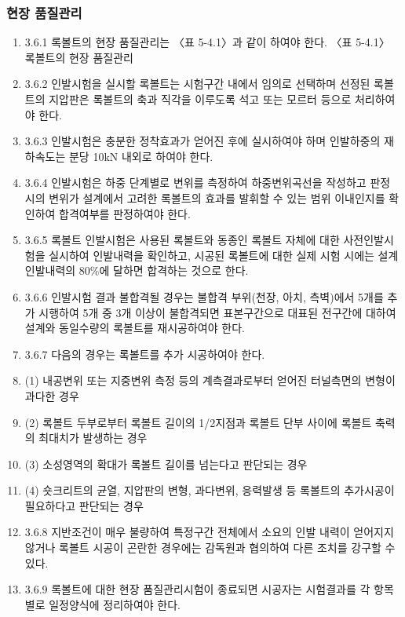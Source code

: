 \subsubsection{  현장 품질관리}
\begin{enumerate}
\item  3.6.1 록볼트의 현장 품질관리는 〈표 5-4.1〉과 같이 하여야 한다.  
〈표 5-4.1〉 록볼트의 현장 품질관리
\item  3.6.2 인발시험을 실시할 록볼트는 시험구간 내에서 임의로 선택하며 선정된 록볼트의 지압판은 록볼트의 축과 직각을 이루도록 석고 또는 모르터 등으로 처리하여야 한다.  
\item  3.6.3 인발시험은 충분한 정착효과가 얻어진 후에 실시하여야 하며 인발하중의 재하속도는 분당 10kN 내외로 하여야 한다.  
\item  3.6.4 인발시험은 하중 단계별로 변위를 측정하여 하중변위곡선을 작성하고 판정 시의 변위가 설계에서 고려한 록볼트의 효과를 발휘할 수 있는 범위 이내인지를 확인하여 합격여부를 판정하여야 한다.  
\item  3.6.5 록볼트 인발시험은 사용된 록볼트와 동종인 록볼트 자체에 대한 사전인발시험을 실시하여 인발내력을 확인하고, 시공된 록볼트에 대한 실제 시험 시에는 설계인발내력의 80\%에 달하면 합격하는 것으로 한다.  
\item  3.6.6 인발시험 결과 불합격될 경우는 불합격 부위(천장, 아치, 측벽)에서 5개를 추가 시행하여 5개 중 3개 이상이 불합격되면 표본구간으로 대표된 전구간에 대하여 설계와 동일수량의 록볼트를 재시공하여야 한다.  
\item  3.6.7 다음의 경우는 록볼트를 추가 시공하여야 한다.  
\item  (1) 내공변위 또는 지중변위 측정 등의 계측결과로부터 얻어진 터널측면의 변형이 과다한 경우 
\item  (2) 록볼트 두부로부터 록볼트 길이의 1/2지점과 록볼트 단부 사이에 록볼트 축력의 최대치가 발생하는 경우 
\item  (3) 소성영역의 확대가 록볼트 길이를 넘는다고 판단되는 경우 
\item  (4) 숏크리트의 균열, 지압판의 변형, 과다변위, 응력발생 등 록볼트의 추가시공이 필요하다고 판단되는 경우 
 
\item  3.6.8 지반조건이 매우 불량하여 특정구간 전체에서 소요의 인발 내력이 얻어지지 않거나 록볼트 시공이 곤란한 경우에는 감독원과 협의하여 다른 조치를 강구할 수 있다.  
\item  3.6.9 록볼트에 대한 현장 품질관리시험이 종료되면 시공자는 시험결과를 각 항목별로 일정양식에 정리하여야 한다.  
\end{enumerate}


